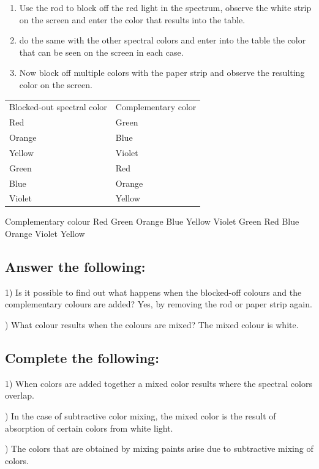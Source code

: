 \documentclass[12pt]{article}
\begin{document}
\begin{enumerate}
\item Use the rod to block off the red light in the spectrum, observe the white strip on the screen and enter the color that results into the table.
\item do the same with the other spectral colors and enter into the table the color that can be seen on the screen in each case.
\item Now block off multiple colors with the paper strip and observe the resulting color on the screen.
\end{enumerate}

\begin{table}[]
\begin{tabular}{ll}
 Blocked-out spectral color & Complementary color  \\
Red & Green \\
Orange & Blue \\
Yellow & Violet \\
Green & Red \\
Blue &  Orange \\
Violet & Yellow 
\end{tabular}
\end{table}

Complementary colour
Red Green
Orange Blue
Yellow Violet
Green Red
Blue Orange
Violet Yellow 
\subsection*{Answer the following:}

1) Is it possible to find out what happens when
the blocked-off colours and the complementary
colours are added?
Yes, by removing the rod or paper strip
again.

) What colour results when the colours are
mixed?
The mixed colour is white.


\subsection*{Complete the following:}

1) When colors are added together a mixed color results where the spectral colors overlap.

) In the case of subtractive color mixing, the
mixed color is the result of absorption of
certain colors from white light.

) The colors that are obtained by mixing paints
arise due to subtractive mixing of colors. 
\end{document}
